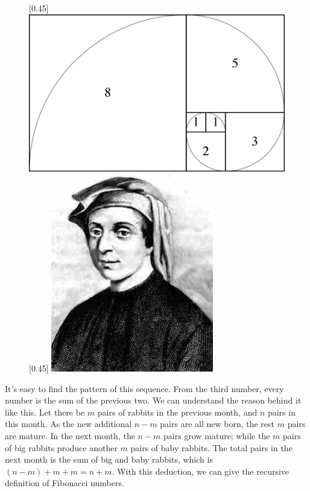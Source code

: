 \documentclass[UTF8]{article}
\begin{document}
\begin{figure}[htbp]
 \centering
 [0.45\linewidth]{
     \includegraphics[scale=0.4]{img/fibonacci_spiral.jpg}}
 [0.45\linewidth]{
     \includegraphics[scale=0.35]{img/Fibonacci.jpg}}
 \captionsetup{labelformat=empty}
 \caption{}
 \label{fig:fibonacci_spiral}
 \label{fig:Fibonacci}
\end{figure}

It's easy to find the pattern of this sequence. From the third number, every number is the sum of the previous two. We can understand the reason behind it like this. Let there be $m$ pairs of rabbits in the previous month, and $n$ pairs in this month. As the new additional $n - m$ pairs are all new born, the rest $m$ pairs are mature. In the next month, the $n - m$ pairs grow mature; while the $m$ pairs of big rabbits produce another $m$ pairs of baby rabbits. The total pairs in the next month is the sum of big and baby rabbits, which is $(n - m) + m + m = n + m$. With this deduction, we can give the recursive definition of Fibonacci numbers.
\end{document}

